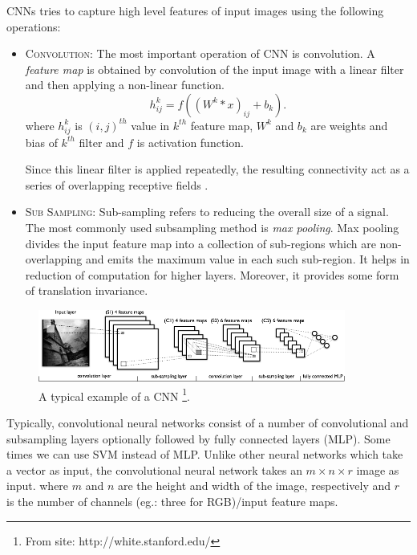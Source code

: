 \noindent CNNs tries to capture high level features of input images using the following operations:
\begin{itemize}
\item \textsc{Convolution}: The most important operation of CNN is convolution. A \textit{feature map} is obtained by convolution of the input image with a linear filter and then applying a non-linear function. 
$$h^k_{ij} = \mathit{f}( (W^k * x)_{ij} + b_k ).$$
where $h^k_{ij}$ is $(i,j)^{th}$ value in $k^{th}$ feature map, $W^k$ and $b_k$ are weights and bias of $k^{th}$ filter and $\mathit{f}$ is activation function.

Since this linear filter is applied repeatedly, the resulting connectivity act as a series of overlapping receptive fields \cite{KarpathyCVPR14}.
\item \textsc{Sub Sampling}: Sub-sampling refers to reducing the overall size of a signal. The most commonly used subsampling method is \textit{max pooling}. Max pooling divides the input feature map into a collection of sub-regions which are non-overlapping and emits the maximum value in each such sub-region. It helps in reduction of computation for higher layers. Moreover, it provides some form of translation invariance. 
\end{itemize}

\begin{figure}[!ht]
\centering
\includegraphics[width=0.9\textwidth]{./imgs/cnn1.png} 
\caption[An example of a convolutional neural network]{A typical example of a CNN \footnote{From site: http://white.stanford.edu/}. }
\label{fig:cnn}
\end{figure}

Typically, convolutional neural networks consist of a number of convolutional and subsampling layers optionally followed by fully connected layers (MLP). Some times we can use SVM instead of MLP. Unlike other neural networks which take a vector as input,  the convolutional neural network takes an $m \times n \times r$ image as input. where $m$ and $n$ are the height and width of the image, respectively and $r$ is the number of channels (eg.: three for RGB)/input feature maps. 

